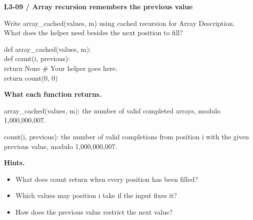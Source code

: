 \documentclass[11pt,a4paper]{article}
\begin{document}
\par\noindent\begin{minipage}{\linewidth}
\textbf{L3-09 / Array recursion remembers the previous value}\par\smallskip Write array\_cached(values, m) using cached recursion for Array Description. What does the helper need besides the next position to fill?\par
\par{}\par\smallskip\noindent\colorbox{codepaper}{\parbox{\dimexpr\linewidth-2\fboxsep\relax}{\small\ttfamily\raggedright def array\_cached(values, m):\\\hspace*{2.4em}def count(i, previous):\\\hspace*{4.8em}return None  \# Your helper goes here.\\\hspace*{2.4em}return count(0, 0)}}\par
{\small\textbf{What each function returns.}\par array\_cached(values, m): the number of valid completed arrays, modulo 1,000,000,007.\par count(i, previous): the number of valid completions from position i with the given previous value, modulo 1,000,000,007.\par }
{\small\textbf{Hints.}}\begin{itemize}\item What does count return when every position has been filled?\item Which values may position i take if the input fixes it?\item How does the previous value restrict the next value?\end{itemize}
\end{minipage}\par\vspace{4mm}
\end{document}
